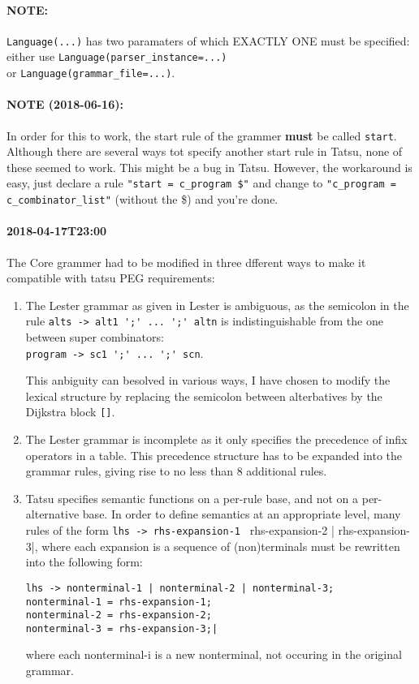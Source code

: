\documentclass[11pt, a4paper]{article}
\begin{document}
\paragraph{NOTE:} \verb|Language(...)| has two paramaters of which EXACTLY ONE must be specified: either use
\verb|Language(parser_instance=...)| \\
or \verb|Language(grammar_file=...)|.

\paragraph{NOTE (2018-06-16):} In order for this to work, the start rule of the grammer \textbf{must} be called \verb|start|. 
Although there are several ways tot specify another start rule in Tatsu, none of these seemed to work. 
This might be a bug in Tatsu. 
However, the workaround is easy, just declare a rule \verb|"start = c_program $"| and change to \verb|"c_program = c_combinator_list"| (without the \$) and you're done.

\paragraph{2018-04-17T23:00}

The Core grammer had to be modified in three dfferent ways to make it compatible with tatsu PEG requirements:

\begin{enumerate}

\item The Lester grammar as given in Lester is ambiguous, as the semicolon in the rule 
\verb|alts -> alt1 ';' ... ';' altn|
is indistinguishable from the one between super combinators:\\
\verb|program -> sc1 ';' ... ';' scn|.

This anbiguity can besolved in various ways, I have chosen to modify the lexical structure by replacing the semicolon between alterbatives by the Dijkstra block \verb|[]|.

\item The Lester grammar is incomplete as it only specifies the precedence of infix operators in a table. This precedence structure has to be expanded into the grammar rules, giving rise to no less than 8 additional rules.

\item Tatsu specifies semantic functions on a per-rule base, and not on a per-alternative base. In order to define semantics at an appropriate level, many rules of the form
\verb|lhs -> rhs-expansion-1 | rhs-expansion-2 | rhs-expansion-3|, 
where each expansion is a sequence of (non)terminals must be rewritten into the following form:

\begin{Verbatim}
lhs -> nonterminal-1 | nonterminal-2 | nonterminal-3;
nonterminal-1 = rhs-expansion-1;
nonterminal-2 = rhs-expansion-2;
nonterminal-3 = rhs-expansion-3;|
\end{Verbatim}
where each nonterminal-i is a new nonterminal, not occuring in the original grammar.
\end{enumerate}
\end{document}
